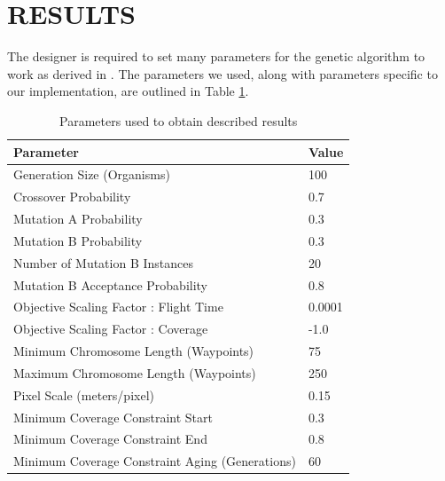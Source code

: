 \documentclass[letterpaper, 10 pt, conference]{ieeeconf}  %
\begin{document}
\section{RESULTS}\label{results}

The designer is required to set many parameters for the genetic algorithm to work as derived in \cite{Parkinson2019}. The parameters we used, along with parameters specific to our implementation, are outlined in Table \ref{tab:parameters}.

\begin{table}[]
  \caption{Parameters used to obtain described results}
\begin{tabular}{l|l}
\hline
\multicolumn{1}{|l|}{Parameter}                 & \multicolumn{1}{l|}{Value} \\ \hline
Generation Size (Organisms)                     & 100                        \\
Crossover Probability                           & 0.7                        \\
Mutation A Probability                          & 0.3                        \\
Mutation B Probability                          & 0.3                        \\
Number of Mutation B Instances                  & 20                         \\
Mutation B Acceptance Probability               & 0.8                        \\
Objective Scaling Factor : Flight Time          & 0.0001                     \\
Objective Scaling Factor : Coverage             & -1.0                       \\
Minimum Chromosome Length (Waypoints)           & 75                         \\
Maximum Chromosome Length (Waypoints)           & 250                        \\
Pixel Scale (meters/pixel)                      & 0.15                       \\
Minimum Coverage Constraint Start               & 0.3                        \\
Minimum Coverage Constraint End                 & 0.8                        \\
Minimum Coverage Constraint Aging (Generations) & 60                         \\
\end{tabular}
\label{tab:parameters}
\end{table}
\end{document}
